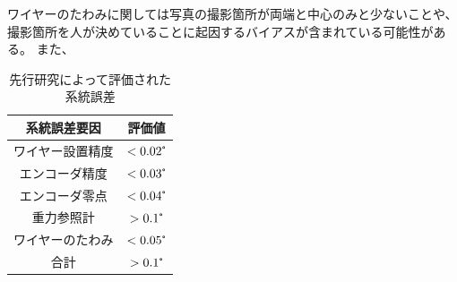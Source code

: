 \documentclass[../../main.tex]{subfiles}
\begin{document}
ワイヤーのたわみに関しては写真の撮影箇所が両端と中心のみと少ないことや、撮影箇所を人が決めていることに起因するバイアスが含まれている可能性がある。
また、

\begin{table}[H]
    \centering
    \caption{先行研究によって評価された系統誤差}
    \begin{tabular}{|c|c|}
        \hline
        系統誤差要因 & 評価値 \\
        \hline
        ワイヤー設置精度 & $< 0.02\tcdegree$ \\
        エンコーダ精度 & $<0.03\tcdegree$ \\
        エンコーダ零点 & $<0.04\tcdegree$ \\
        重力参照計 & $>0.1\tcdegree$ \\
        ワイヤーのたわみ & $<0.05\tcdegree$ \\
        \hline
        合計 & $>0.1\tcdegree$ \\
        \hline
    \end{tabular}
    \label{tab:systematic_errors_old}
\end{table}
\end{document}
